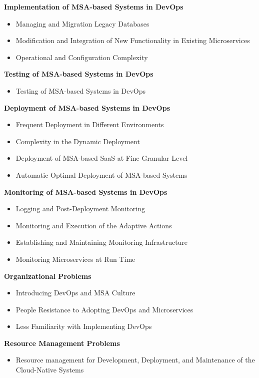 \textbf{Implementation of MSA-based Systems in DevOps}
\begin{itemize}
    \item Managing and Migration Legacy Databases
    \item Modification and Integration of New Functionality in Existing
    Microservices
    \item Operational and Configuration Complexity
\end{itemize}

\textbf{Testing of MSA-based Systems in DevOps}
\begin{itemize}
    \item Testing of MSA-based Systems in DevOps
\end{itemize}

\textbf{Deployment of MSA-based Systems in DevOps}
\begin{itemize}
    \item Frequent Deployment in Different Environments
    \item Complexity in the Dynamic Deployment
    \item Deployment of MSA-based SaaS at Fine Granular Level
    \item Automatic Optimal Deployment of MSA-based Systems
\end{itemize}

\textbf{Monitoring of MSA-based Systems in DevOps}
\begin{itemize}
    \item Logging and Post-Deployment Monitoring
    \item Monitoring and Execution of the Adaptive Actions
    \item Establishing and Maintaining Monitoring Infrastructure
    \item Monitoring Microservices at Run Time
\end{itemize}

\textbf{Organizational Problems}
\begin{itemize}
    \item Introducing DevOps and MSA Culture
    \item People Resistance to Adopting DevOps and Microservices
    \item Less Familiarity with Implementing DevOps
\end{itemize}

\textbf{Resource Management Problems}
\begin{itemize}
    \item Resource management for Development, Deployment,
    and Maintenance of the Cloud-Native Systems
\end{itemize}


